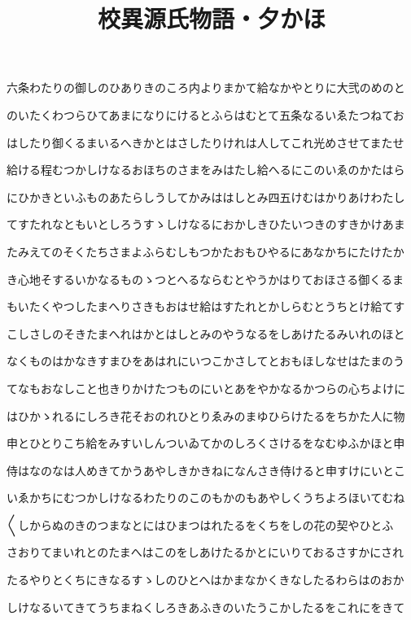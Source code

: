 \documentclass[a4paper,11pt,landscape]{ltjtarticle}
\title{校異源氏物語・夕かほ}
\date{}
\begin{document}
\maketitle

六条わたりの御しのひありきのころ内よりまかて給なかやとりに大弐のめのと
\par\medskip
のいたくわつらひてあまになりにけるとふらはむとて五条なるいゑたつねてお
\par\medskip
はしたり御くるまいるへきかとはさしたりけれは人してこれ光めさせてまたせ
\par\medskip
給ける程むつかしけなるおほちのさまをみはたし給へるにこのいゑのかたはら
\par\medskip
にひかきといふものあたらしうしてかみははしとみ四五けむはかりあけわたし
\par\medskip
てすたれなともいとしろうすゝしけなるにおかしきひたいつきのすきかけあま
\par\medskip
たみえてのそくたちさまよふらむしもつかたおもひやるにあなかちにたけたか
\par\medskip
き心地そするいかなるものゝつとへるならむとやうかはりておほさる御くるま
\par\medskip
もいたくやつしたまへりさきもおはせ給はすたれとかしらむとうちとけ給てす
\par\medskip
こしさしのそきたまへれはかとはしとみのやうなるをしあけたるみいれのほと
\par\medskip
なくものはかなきすまひをあはれにいつこかさしてとおもほしなせはたまのう
\par\medskip
てなもおなしこと也きりかけたつものにいとあをやかなるかつらの心ちよけに
\par\medskip
はひかゝれるにしろき花そおのれひとりゑみのまゆひらけたるをちかた人に物
\par\medskip
申とひとりこち給をみすいしんついゐてかのしろくさけるをなむゆふかほと申
\par\medskip
侍はなのなは人めきてかうあやしきかきねになんさき侍けると申すけにいとこ
\par\medskip
いゑかちにむつかしけなるわたりのこのもかのもあやしくうちよろほいてむね
\par\medskip
〱しからぬのきのつまなとにはひまつはれたるをくちをしの花の契やひとふ
\par\medskip
さおりてまいれとのたまへはこのをしあけたるかとにいりておるさすかにされ
\par\medskip
たるやりとくちにきなるすゝしのひとへはかまなかくきなしたるわらはのおか
\par\medskip
しけなるいてきてうちまねくしろきあふきのいたうこかしたるをこれにをきて
\end{document}
